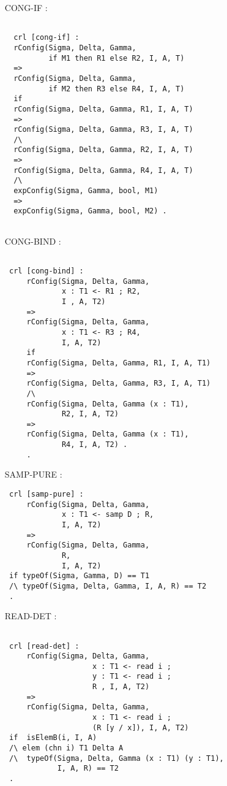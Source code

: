 \documentclass{article}
\begin{document}
\begin{itemize}
\begin{lstlisting}
   \end{lstlisting} 
\item[CONG-IF]:
\begin{lstlisting} 
 
  crl [cong-if] : 
  rConfig(Sigma, Delta, Gamma,   
          if M1 then R1 else R2, I, A, T)
  => 
  rConfig(Sigma, Delta, Gamma, 
          if M2 then R3 else R4, I, A, T)
  if
  rConfig(Sigma, Delta, Gamma, R1, I, A, T) 
  => 
  rConfig(Sigma, Delta, Gamma, R3, I, A, T)
  /\
  rConfig(Sigma, Delta, Gamma, R2, I, A, T) 
  => 
  rConfig(Sigma, Delta, Gamma, R4, I, A, T) 
  /\
  expConfig(Sigma, Gamma, bool, M1)
  => 
  expConfig(Sigma, Gamma, bool, M2) .   
  
  \end{lstlisting} 
\item[CONG-BIND]:
\begin{lstlisting}             
          
 crl [cong-bind] :
     rConfig(Sigma, Delta, Gamma, 
             x : T1 <- R1 ; R2, 
             I , A, T2) 
     => 
     rConfig(Sigma, Delta, Gamma, 
             x : T1 <- R3 ; R4, 
             I, A, T2) 
     if
     rConfig(Sigma, Delta, Gamma, R1, I, A, T1)  
     => 
     rConfig(Sigma, Delta, Gamma, R3, I, A, T1) 
     /\
     rConfig(Sigma, Delta, Gamma (x : T1), 
             R2, I, A, T2)
     => 
     rConfig(Sigma, Delta, Gamma (x : T1), 
             R4, I, A, T2) .
     .
 \end{lstlisting} 
\item[SAMP-PURE]:
\begin{lstlisting}
 crl [samp-pure] : 
     rConfig(Sigma, Delta, Gamma, 
             x : T1 <- samp D ; R, 
             I, A, T2)
     => 
     rConfig(Sigma, Delta, Gamma,  
             R, 
             I, A, T2)
 if typeOf(Sigma, Gamma, D) == T1 
 /\ typeOf(Sigma, Delta, Gamma, I, A, R) == T2 
 . 
  \end{lstlisting} 
\item[READ-DET]:
\begin{lstlisting}

 crl [read-det] : 
     rConfig(Sigma, Delta, Gamma, 
                    x : T1 <- read i ; 
                    y : T1 <- read i ; 
                    R , I, A, T2) 
     => 
     rConfig(Sigma, Delta, Gamma, 
                    x : T1 <- read i ; 
                    (R [y / x]), I, A, T2)
 if  isElemB(i, I, A)  
 /\ elem (chn i) T1 Delta A
 /\  typeOf(Sigma, Delta, Gamma (x : T1) (y : T1), 
            I, A, R) == T2 
 .
 

\end{lstlisting}
\end{itemize}
\end{document}
